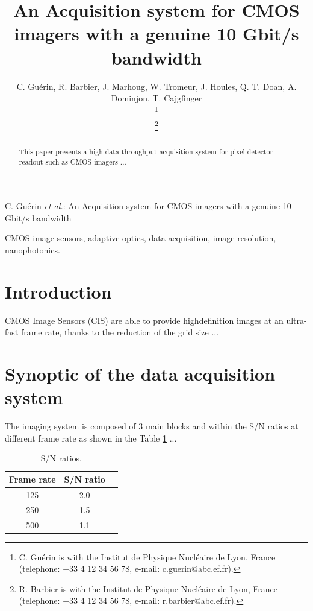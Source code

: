 \documentclass[journal]{IEEEtran}
\begin{document}
\title{An Acquisition system for CMOS imagers with a genuine 10 Gbit/s bandwidth}

\author{
C. Gu\'erin, R. Barbier, J. Marhoug, W. Tromeur, J. Houles, Q. T. Doan, A. Dominjon, T. Cajgfinger
     
\thanks{C. Gu\'erin is with the Institut de Physique Nucl\'eaire de Lyon, France (telephone: +33 4 12 34 56 78, e-mail: c.guerin@abc.ef.fr).}

\thanks{R. Barbier is with the Institut de Physique Nucl\'eaire de Lyon, France (telephone: +33 4 12 34 56 78, e-mail: r.barbier@abc.ef.fr).}
}

 {C. Gu\'erin \textit{et al.}: An Acquisition system for CMOS imagers with a genuine 10 Gbit/s bandwidth}

\maketitle

\begin{abstract}
This paper presents a high data throughput acquisition system for pixel detector readout such as CMOS imagers ...
\end{abstract}

\begin{IEEEkeywords}
CMOS image sensors, adaptive optics, data acquisition, image resolution, nanophotonics.
\end{IEEEkeywords}


\section{Introduction}
\label{sec:intro}

 CMOS Image Sensors (CIS) are able to provide highdefinition images at an ultra-fast frame rate, thanks to the reduction of the grid size ...

\section{Synoptic of the data acquisition system}
\label{sec:synoptic}

The imaging system is composed of 3 main blocks\cite{bib_remi2011} and within the S/N ratios at different frame rate as shown in the Table \ref{tab:data} ...

\begin{table}[!htb]
\centering
	\caption{S/N ratios.}
	\label{tab:data} 
	\begin{tabular}{ccc}
		\hline
		Frame rate	& S/N ratio\\
		\hline
		125	& 2.0\\
		250	& 1.5\\
		500	& 1.1\\
		\hline
	\end{tabular}
\end{table}
\end{document}
